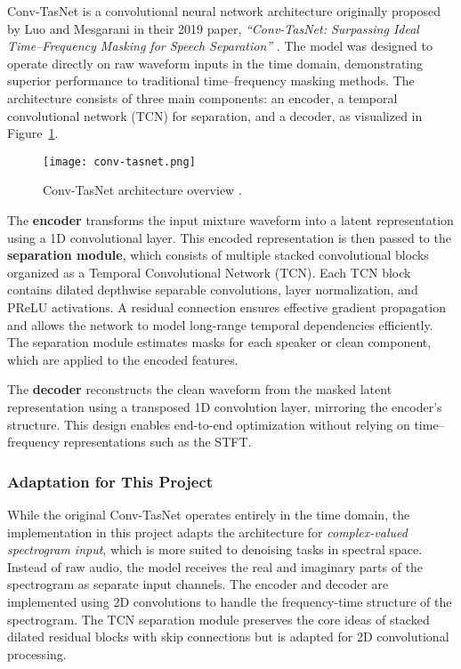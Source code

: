 Conv-TasNet is a convolutional neural network architecture originally proposed by Luo and Mesgarani in their 2019 paper, \textit{``Conv-TasNet: Surpassing Ideal Time--Frequency Masking for Speech Separation''} \cite{luo2019conv}. The model was designed to operate directly on raw waveform inputs in the time domain, demonstrating superior performance to traditional time--frequency masking methods. The architecture consists of three main components: an encoder, a temporal convolutional network (TCN) for separation, and a decoder, as visualized in Figure~\ref{fig:convtasnet}.

\begin{figure}[h]
    \centering
    \texttt{[image: conv-tasnet.png]}
    \caption{\label{fig:convtasnet}Conv-TasNet architecture overview \cite{luo2019conv}.}
\end{figure}

The \textbf{encoder} transforms the input mixture waveform into a latent representation using a 1D convolutional layer. This encoded representation is then passed to the \textbf{separation module}, which consists of multiple stacked convolutional blocks organized as a Temporal Convolutional Network (TCN). Each TCN block contains dilated depthwise separable convolutions, layer normalization, and PReLU activations. A residual connection ensures effective gradient propagation and allows the network to model long-range temporal dependencies efficiently. The separation module estimates masks for each speaker or clean component, which are applied to the encoded features.

The \textbf{decoder} reconstructs the clean waveform from the masked latent representation using a transposed 1D convolution layer, mirroring the encoder’s structure. This design enables end-to-end optimization without relying on time--frequency representations such as the STFT.

\subsubsection*{Adaptation for This Project}

While the original Conv-TasNet operates entirely in the time domain, the implementation in this project adapts the architecture for \textit{complex-valued spectrogram input}, which is more suited to denoising tasks in spectral space. Instead of raw audio, the model receives the real and imaginary parts of the spectrogram as separate input channels. The encoder and decoder are implemented using 2D convolutions to handle the frequency-time structure of the spectrogram. The TCN separation module preserves the core ideas of stacked dilated residual blocks with skip connections but is adapted for 2D convolutional processing.

